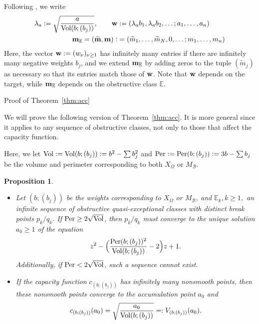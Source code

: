 \documentclass[11pt, reqno]{amsart}
\makeatletter
\def\subsection{\@startsection{subsection}{2}%
  \z@{.75\linespacing\@plus.7\linespacing}{-.5em}%
  {\normalfont\large\bfseries}}
\newtheorem{prop}[thm]{Proposition}
\theoremstyle{remark}
\numberwithin{equation}{subsection}
\numberwithin{figure}{section}
\theoremstyle{customremark}
\newcommand{\Vol}{{\rm Vol}}
\newcommand{\Per}{{\rm Per}}
\newcommand{\bbm}{{\bf m}}
\newcommand{\bw}{{\bf w}}
\newcommand{\Tm}{{\widetilde m}}
\newcommand{\bE}{{\mathbb E}}
\newcommand{\la}{{\lambda}}
\newcommand{\MS}{{\medskip}}
\makeatother
\begin{document}
Following \cite[(2.19)]{AADT}, we write 
\begin{align}\label{eq:definition}
\la_a: =\sqrt{\frac{a}{\Vol(b;(b_j))}}, \qquad
\bw&: =(\la_a b_1, \la_a b_2,\dots; a_1,\dots,a_n) \\ \notag
\bbm_\bE= (\widetilde{\bbm}, \bbm):  & = (\Tm_1,\dots, \Tm_N, 0, \dots;  m_1,\dots, m_n)
\end{align} 
Here, the vector $\bw: = (w_\nu)_{\nu\ge 1}$  has infinitely many entries if there are infinitely many negative weights $b_j$, and we extend $\bbm_\bE$ by adding zeros to the tuple $(\Tm_j)$ as  necessary so that its entries match those  of  $\bw$. Note that  $\bw$  depends on the target, while $\bbm_\bE$ depends on the obstructive class $\bE$.
\MS

\subsection{Proof of Theorem~\ref{thm:acc}}

 
We  will prove the following version of Theorem~\ref{thm:acc}. It is more general since it applies to any sequence of obstructive classes, not only to those that affect the capacity function.


Here, we let $\Vol: = \Vol(b;(b_j)):=b^2-\sum b_j^2$ and $\Per: = \Per(b;(b_j)):=3b-\sum b_j$ be the volume and perimeter corresponding to both $X_\Omega$ or $M_{\mathcal{B}}$. 

\begin{prop}\label{prop:accum1} \begin{itemize}\item [{\rm (i)}] Let $(b; (b_j))$ be the weights corresponding to $X_\Omega$ or $M_{\mathcal{B}}$, 
and $\bE_k, k\ge 1, $ an infinite sequence of obstructive quasi-exceptional classes with distinct break points $p_k/q_k$. If $\Per\ge 2\sqrt{\Vol}$, 
then $p_k/q_k$ 
 must converge to the unique  solution $a_0\ge 1$  of the  equation
\begin{align}\label{eq:acc} z^2 - \Bigl(\frac{\Per(b;(b_j))^2}{\Vol(b; (b_j))} - 2\Bigr)z + 1. 
\end{align} Additionally, if $\Per<2\sqrt{\Vol}$, such a sequence cannot exist. 

\item [{\rm (ii)}]   If the capacity function $c_{(b;(b_j))}$ has infinitely many nonsmooth points, then these nonsmooth points converge to 
the accumulation point $a_0$ and
$$
c_{(b;(b_j))}(a_0) = \sqrt{\frac{a_0}{\Vol(b;(b_j))}} =:V_{(b;(b_j))}(a_0).
$$
\end{itemize}
\end{prop}
\end{document}
